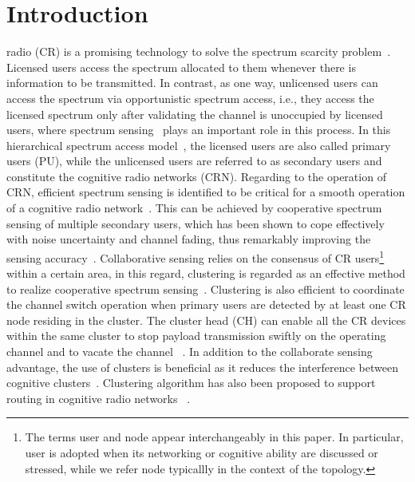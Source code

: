 \documentclass[10pt,journal,compsoc]{IEEEtran}
\theoremstyle{mytheoremstyle}
\theoremstyle{mytheoremstyle}
\theoremstyle{mytheoremstyle}
\newcommand{\ie}{i.e., }
\begin{document}
\section{Introduction}
\label{intro}
 radio (CR) is a promising technology to solve the spectrum scarcity problem~\cite{Mitola}.
Licensed users access the spectrum allocated to them whenever there is information to be transmitted.
In contrast, as one way, unlicensed users can access the spectrum via opportunistic spectrum access, \ie they access the licensed spectrum only after validating the channel is unoccupied by licensed users, where spectrum sensing~\cite{sensing_survey_2009} plays an important role in this process.
%
In this hierarchical spectrum access model~\cite{zhao_survey_DSA_2007}, the licensed users are also called primary users (PU), while the unlicensed users are referred to as secondary users and constitute the cognitive radio networks (CRN).
%
Regarding to the operation of CRN, efficient spectrum sensing is identified to be critical for a smooth operation of a cognitive radio network~\cite{Sahai_FundamentalDesignTradeoffs2006}.
This can be achieved by cooperative spectrum sensing of multiple secondary users, which has been shown to cope effectively with noise uncertainty and channel fading, thus remarkably improving the sensing accuracy~\cite{coorperativeSensing_Akyildiz11}.
Collaborative sensing relies on the consensus of CR users\footnote{The terms user and node appear interchangeably in this paper. In particular, user is adopted when its networking or cognitive ability are discussed or stressed, while we refer node typicallly in the context of the topology.} within a certain area, in this regard, clustering is regarded as an effective method to realize cooperative spectrum sensing~\cite{Sun07_clustering_spectrum_secsing, Zhao07}.
%
Clustering is also efficient to coordinate the channel switch operation when primary users are detected by at least one CR node residing in the cluster.
The cluster head (CH) can enable all the CR devices within the same cluster to stop payload transmission swiftly on the operating channel and to vacate the channel ~\cite{willkomm08}.
%
In addition to the collaborate sensing advantage, the use of clusters is beneficial as it reduces the interference between cognitive clusters~\cite{centralizedSharing80222}.
Clustering algorithm has also been proposed to support routing in cognitive radio networks ~\cite{Abbasi_survey_07}.
\end{document}
